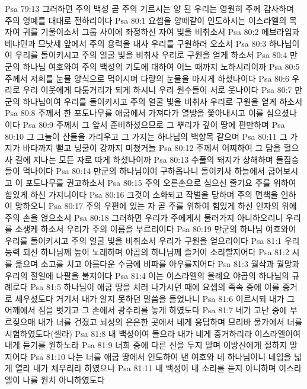 Psa 79:13  그러하면 주의 백성 곧 주의 기르시는 양 된 우리는 영원히 주께 감사하며 주의 영예를 대대로 전하리이다
Psa 80:1  요셉을 양떼같이 인도하시는 이스라엘의 목자여 귀를 기울이소서 그룹 사이에 좌정하신 자여 빛을 비취소서
Psa 80:2  에브라임과 베냐민과 므낫세 앞에서 주의 용력을 내사 우리를 구원하러 오소서
Psa 80:3  하나님이여 우리를 돌이키시고 주의 얼굴 빛을 비취사 우리로 구원을 얻게 하소서
Psa 80:4  만군의 하나님 여호와여 주의 백성의 기도에 대하여 어느 때까지 노하시리이까
Psa 80:5  주께서 저희를 눈물 양식으로 먹이시며 다량의 눈물을 마시게 하셨나이다
Psa 80:6  우리로 우리 이웃에게 다툼거리가 되게 하시니 우리 원수들이 서로 웃나이다
Psa 80:7  만군의 하나님이여 우리를 돌이키시고 주의 얼굴 빛을 비취사 우리로 구원을 얻게 하소서
Psa 80:8  주께서 한 포도나무를 애굽에서 가져다가 열방을 쫓아내시고 이를 심으셨나이다
Psa 80:9  주께서 그 앞서 준비하셨으므로 그 뿌리가 깊이 땅에 편만하며
Psa 80:10  그 그늘이 산들을 가리우고 그 가지는 하나님의 백향목 같으며
Psa 80:11  그 가지가 바다까지 뻗고 넝쿨이 강까지 미쳤거늘
Psa 80:12  주께서 어찌하여 그 담을 헐으사 길에 지나는 모든 자로 따게 하셨나이까
Psa 80:13  수풀의 돼지가 상해하며 들짐승들이 먹나이다
Psa 80:14  만군의 하나님이여 구하옵나니 돌이키사 하늘에서 굽어보시고 이 포도나무를 권고하소서
Psa 80:15  주의 오른손으로 심으신 줄기요 주를 위하여 힘있게 하신 가지니이다
Psa 80:16  그것이 소화되고 작벌을 당하며 주의 면책을 인하여 망하오니
Psa 80:17  주의 우편에 있는 자 곧 주를 위하여 힘있게 하신 인자의 위에 주의 손을 얹으소서
Psa 80:18  그러하면 우리가 주에게서 물러가지 아니하오리니 우리를 소생케 하소서 우리가 주의 이름을 부르리이다
Psa 80:19  만군의 하나님 여호와여 우리를 돌이키시고 주의 얼굴 빛을 비취소서 우리가 구원을 얻으리이다
Psa 81:1  우리 능력 되신 하나님께 높이 노래하며 야곱의 하나님께 즐거이 소리할지어다
Psa 81:2  시를 읊으며 소고를 치고 아름다운 수금에 비파를 아우를지어다
Psa 81:3  월삭과 월망과 우리의 절일에 나팔을 불지어다
Psa 81:4  이는 이스라엘의 율례요 야곱의 하나님의 규례로다
Psa 81:5  하나님이 애굽 땅을 치러 나가시던 때에 요셉의 족속 중에 이를 증거로 세우셨도다 거기서 내가 알지 못하던 말씀을 들었나니
Psa 81:6  이르시되 내가 그 어깨에서 짐을 벗기고 그 손에서 광주리를 놓게 하였도다
Psa 81:7  네가 고난 중에 부르짖으매 내가 너를 건졌고 뇌성의 은은한 곳에서 네게 응답하며 므리바 물가에서 너를 시험하였도다(셀라)
Psa 81:8  내 백성이여 들으라 내가 네게 증거하리라 이스라엘이여 내게 듣기를 원하노라
Psa 81:9  너희 중에 다른 신을 두지 말며 이방신에게 절하지 말지어다
Psa 81:10  나는 너를 애굽 땅에서 인도하여 낸 여호와 네 하나님이니 네입을 넓게 열라 내가 채우리라 하였으나
Psa 81:11  내 백성이 내 소리를 듣지 아니하며 이스라엘이 나를 원치 아니하였도다
